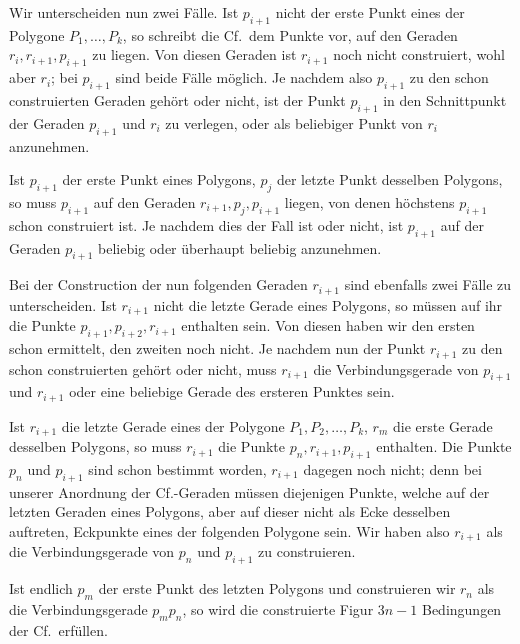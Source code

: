 \documentclass[11pt]{article}
\newcommand{\Cf}{\textup{Cf.}}
\begin{document}
Wir unterscheiden nun zwei Fälle. Ist $p_{i+1}$ nicht der erste Punkt eines der Polygone $P_1,\ldots,P_k$, so schreibt die \Cf\ dem Punkte vor, auf den Geraden $r_i,r_{i+1},p_{i+1}$ zu liegen. Von diesen Geraden ist $r_{i+1}$ noch nicht construiert, wohl aber $r_i$; bei $p_{i+1}$ sind beide Fälle möglich. Je nachdem also $p_{i+1}$ zu den schon construierten Geraden gehört oder nicht, ist der Punkt $p_{i+1}$ in den Schnittpunkt der Geraden $p_{i+1}$ und $r_i$ zu verlegen, oder als beliebiger Punkt von $r_i$ anzunehmen.

Ist $p_{i+1}$ der erste Punkt eines Polygons, $p_j$ der letzte Punkt desselben Polygons, so muss $p_{i+1}$ auf den Geraden $r_{i+1},p_j,p_{i+1}$ liegen, von denen höchstens $p_{i+1}$ schon construiert ist. Je nachdem dies der Fall ist oder nicht, ist $p_{i+1}$ auf der Geraden $p_{i+1}$ beliebig oder überhaupt beliebig anzunehmen.

Bei der Construction der nun folgenden Geraden $r_{i+1}$ sind ebenfalls zwei Fälle zu unterscheiden. Ist $r_{i+1}$ nicht die letzte Gerade eines Polygons, so müssen auf ihr die Punkte $p_{i+1},p_{i+2},r_{i+1}$ enthalten sein. Von diesen haben wir den ersten schon ermittelt, den zweiten noch nicht. Je nachdem nun der Punkt $r_{i+1}$ zu den schon construierten gehört oder nicht, muss $r_{i+1}$ die Verbindungsgerade von $p_{i+1}$ und $r_{i+1}$ oder eine beliebige Gerade des ersteren Punktes sein.

Ist $r_{i+1}$ die letzte Gerade eines der Polygone $P_1,P_2,\ldots,P_k$, $r_m$ die erste Gerade desselben Polygons, so muss $r_{i+1}$ die Punkte $p_n,r_{i+1},p_{i+1}$ enthalten. Die Punkte $p_n$ und $p_{i+1}$ sind schon bestimmt worden, $r_{i+1}$ dagegen noch nicht; denn bei unserer Anordnung der \Cf-Geraden müssen diejenigen Punkte, welche auf der letzten Geraden eines Polygons, aber auf dieser nicht als Ecke desselben auftreten, Eckpunkte eines der folgenden Polygone sein. Wir haben also $r_{i+1}$ als die Verbindungsgerade von $p_n$ und $p_{i+1}$ zu construieren.

Ist endlich $p_m$ der erste Punkt des letzten Polygons und construieren wir $r_n$ als die Verbindungsgerade $p_m p_n$, so wird die construierte Figur $3n-1$ Bedingungen der \Cf\ erfüllen.
\end{document}
